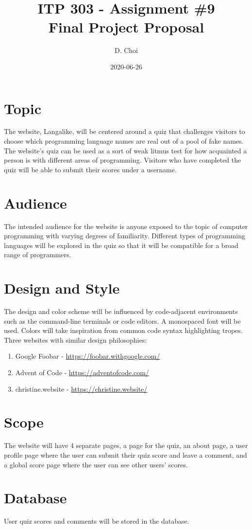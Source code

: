 \documentclass[12pt]{article}
\title{\vspace{-4\baselineskip}ITP 303 - Assignment \#9 \\
Final Project Proposal}
\author{D. Choi}
\date{2020-06-26}
\begin{document}
\maketitle

\section*{Topic}
The website, Langalike, will be centered around a quiz that challenges
visitors to choose which programming language names are real out of a pool of
fake names. The website's quiz can be used as a sort of weak litmus test for
how acquainted a person is with different areas of programming. Visitors who
have completed the quiz will be able to submit their scores under a username.

\section*{Audience}
The intended audience for the website is anyone exposed to the topic of
computer programming with varying degrees of familiarity. Different types
of programming languages will be explored in the quiz so that it will be
compatible for a broad range of programmers.

\section*{Design and Style}
The design and color scheme will be influenced by code-adjacent environments
such as the command-line terminals or code editors. A monospaced font will be
used. Colors will take inspiration from common code syntax highlighting
tropes. \\[\baselineskip]
Three websites with similar design philosophies:
\begin{enumerate}
	\item Google Foobar - \url{https://foobar.withgoogle.com/}
	\item Advent of Code - \url{https://adventofcode.com/}
	\item christine.website - \url{https://christine.website/}
\end{enumerate}
\newpage

\section*{Scope}
The website will have 4 separate pages, a page for the quiz, an about page,
a user profile page where the user can submit their quiz score and leave a
comment, and a global score page where the user can see other users' scores.

\section*{Database}
User quiz scores and comments will be stored in the database.
\end{document}
